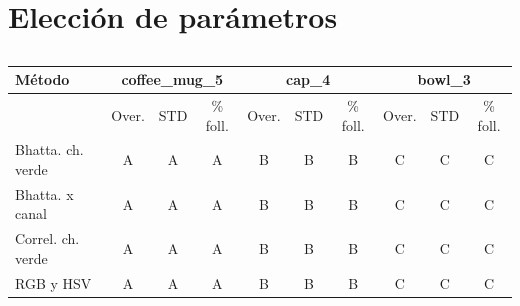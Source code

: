 \section{Elección de parámetros}\label{eleccion_parametros}
\begin{table}[h]
    \begin{tabular}{|l|*{3}{c|}*{3}{c|}*{3}{c|}}
        \hline 
	    Método & \multicolumn{3}{|c|}{coffee\_mug\_5} & \multicolumn{3}{|c|}{cap\_4} & \multicolumn{3}{|c|}{bowl\_3}\\
	    \hline 
         & Over. & STD & \% foll. & Over. & STD & \% foll. & Over. & STD & \% foll. \\
        \hline
        Bhatta. ch. verde & A & A & A & B & B & B & C & C & C\\
	    \hline
	    Bhatta. x canal & A & A & A & B & B & B & C & C & C\\
	    \hline
	    Correl. ch. verde & A & A & A & B & B & B & C & C & C\\
	    \hline
	    RGB y HSV & A & A & A & B & B & B & C & C & C\\
	    \hline
    \end{tabular}
	\caption{}
\end{table}


